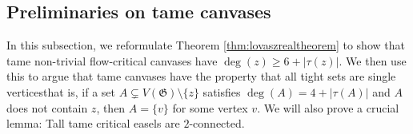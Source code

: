 \documentclass{article}
\newcommand{\Z}{\mathbb{Z}_3}
\newcommand\g{\mathfrak{G}}
\begin{document}
\begin{comment}
For a vertex $v$ of a $\Z$-bordered graph $\g=(G,\beta)$, let
$$\tau^+(v)=\{a-b\mid a,b\ge 0, a+b=\deg(v),a-b\equiv \beta(v)\!\!\pmod 3\};$$
note that an orientation $\varphi$ of edges of $G$ is a nowhere-zero flow in $\g$
if and only if $\deg^+_\varphi v-\deg^-_\varphi v\in\tau^+(v)$ for every $v\in V(G)$.
Let $\tau(v)$ consist of the elements of $\tau^+(v)$ that are smallest in the absolute value.
The values of $\tau$ are given by the following table.
\begin{center}
\begin{tabular}{c|ccc}
\backslashbox{degree}{$\beta$} & $0$ & $1$ & $-1$\\
\hline
even& $\{0\}$ & $\{-2\}$ & $\{2\}$\\
odd& $\{-3,3\}$ & $\{1\}$ & $\{-1\}$
\end{tabular}
\end{center}

Note that $\tau(v)$ has more than one element only when $\deg(v)$ is odd and $\beta(v)=0$,
and in that case both elements of $\tau(v)$ have the same absolute value $3$.  Hence,
slightly abusing the notation, we define $|\tau(v)|$ to be the common absolute value of the
elements of $\tau(v)$.  Hence, the values of $|\tau(v)|$ are given by the following table.
\begin{center}
\begin{tabular}{c|cc}
\backslashbox{degree}{$\beta$} & $0$ & $\pm 1$\\
\hline
even& $0$ & $2$\\
odd& $3$ & $1$
\end{tabular}
\end{center}


Similarly, we write $\tau(v)>0$ or $\tau(v)<0$ to mean that the $\tau(v)$ consists only of a single positive or negative element.
For a set $A\subseteq V(G)$, let $\deg(A)$ be the number of edges of $G$ with exactly one end in $A$, and let us define $\tau(A)$
and $|\tau(A)|$ analogously to the definition for single vertices.  Clearly, $\tau(v)=\tau(\{v\})$ for every $v\in V(G)$.
\end{comment}
\subsection{Preliminaries on tame canvases}\label{subsec:tamecanvases}

In this subsection, we reformulate Theorem \ref{thm:lovaszrealtheorem} to show
that tame non-trivial flow-critical canvases have $\deg(z) \geq 6 + |\tau(z)|$.
We then use this to argue that tame canvases have the property that all tight
sets are single vertices\textemdash that is, if a set $A\subsetneq V(\g)\setminus\{z\}$ satisfies $\deg(A) =
4 + |\tau(A)|$ and $A$ does not contain $z$, then $A = \{v\}$ for some vertex
$v$. We will also prove a crucial lemma: Tall tame critical easels are
$2$-connected.
\end{document}
